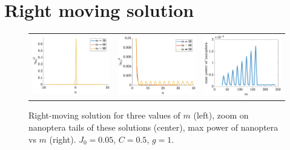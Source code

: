 \documentclass{article}
\begin{document}
\section{Right moving solution}

\begin{figure}[H]
    \centering
    \begin{tabular}{ccc}
    \includegraphics[width=5cm]{rightm} &
    \includegraphics[width=5cm]{rightmnanop} &
    \includegraphics[width=5cm]{rightmnanopmax} \\
    \end{tabular}
    \caption{Right-moving solution for three values of $m$ (left), zoom on nanoptera tails of these solutions (center), max power of nanoptera vs $m$ (right). $J_0 = 0.05$, $C = 0.5$, $g=1$.}
    \label{fig:right1}
\end{figure}
\end{document}
